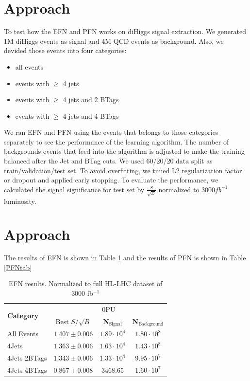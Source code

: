 \documentclass{article}
\begin{document}
\section{Approach}
To test how the EFN and PFN works on diHiggs signal extraction. We generated 1M diHiggs events as signal and 4M QCD events as background. Also, we devided those events into four categories:
\begin{itemize}
    \item all events
    \item events with $ \geq $ 4 jets
    \item events with $ \geq $ 4 jets and 2 BTags
    \item events with $ \geq $ 4 jets and 4 BTags
\end{itemize}
We ran EFN and PFN using the events that belongs to those categories separately to see the performance of the learning algorithm. The number of backgrounds events that feed into the algorithm is adjusted to make the training balanced after the Jet and BTag cuts.
We used 60/20/20 data split as train/validation/test set.
To avoid overfitting, we tuned L2 regularization factor or dropout and applied early stopping.
To evaluate the performance, we calculated the signal significance for test set by $\frac{S}{\sqrt{B}}$ normalized to $3000fb^{-1}$ luminosity.

\section{Approach}
The results of EFN is shown in Table \ref{EFNtab} and the results of PFN is shown in Table \ref{PFNtab}
\begin{table}[h!]
\centering
    \begin{tabular}{|l|c|c|c|} %
      \hline\hline
      \multirow{2}{*}{\textbf{Category}} & \multicolumn{3}{c|}{0PU}\\
      \cline{2-4}
      & Best $S/\sqrt{B}$ & \textbf{N$_{\mathrm{Signal}}$} & \textbf{N$_{\mathrm{Background}}$} \\
      \hline
      All Events & $1.407 \pm 0.006$ & $1.89\cdot 10^4$ & $1.80\cdot 10^8$ \\
      4Jets & $1.363 \pm 0.006$ & $1.63\cdot 10^4$ & $1.43\cdot 10^8$ \\
      4Jets 2BTags & $1.343 \pm 0.006$ & $1.33\cdot 10^4$ & $9.95\cdot 10^7$ \\
      4Jets 4BTags & $0.867 \pm 0.008$ & $3468.65$ & $1.60\cdot 10^7$ \\
      \hline\hline
    \end{tabular}
    \caption{EFN results. Normalized to full HL-LHC dataset of 3000 fb$^{-1}$}
\label{EFNtab}
\end{table}
\end{document}
